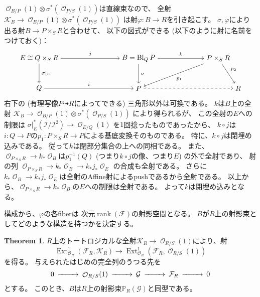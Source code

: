 \documentclass[uplatex]{jsarticle}
\theoremstyle{definition}
\newtheorem{thm}{Theorem}%
\DeclareMathOperator{\rank}{\mathrm{rank}}
\DeclareMathOperator{\Ext}{\mathrm{Ext}}
\DeclareMathOperator{\Bl}{\mathrm{Bl}}
\renewcommand{\P}{\mathbb{P}}
\newcommand{\mcF}{\mathcal{F}}
\newcommand{\mcG}{\mathcal{G}}
\newcommand{\mcI}{\mathcal{I}}
\newcommand{\mcK}{\mathcal{K}}
\newcommand{\mcO}{\mathcal{O}}
\DeclareMathOperator{\OOO}{\mcO}
\newcommand{\OB}{{\OOO_B}}
\renewcommand{\OE}{{\OOO_E}}
\newcommand{\OR}{{\OOO_R}}
\newcommand{\OO}[1]{\OOO_{#1}}
\newcommand{\dto}{\dashrightarrow}
\begin{document}
\(\OO{B/P}(1)\otimes \sigma^*(\OO{P/S}(1))\)は直線束なので、
全射\(\mcK_B\to \OO{B/P}(1)\otimes \sigma^*(\OO{P/S}(1))\)
は射\(\varphi:B\to R\)を引き起こす。
\(\sigma, \varphi\)により出る射\(B\to P\times_S R\)と合わせて、
以下の図式ができる (以下のように射に名前をつけておく)：
\[
\begin{tikzpicture}[auto]
  \node (B) at (0,1.5) {\(E \cong Q\times_SR\)};
  \node (A) at (0,0) {\(Q\)};
  \node (B') at (5,1.5) {\(B = \Bl_QP\)};
  \node (A') at (5,0) {\(P\)};
  \node (B'') at (9,1.5) {\(P\times_SR\)};
  \node (A'') at (10,0) {\(R\)};
  \draw[->] (B) to node{\scriptsize \(\sigma|_E\)} (A);
  \draw[->] (B) to node{\scriptsize \(j\)} (B');
  \draw[->] (B') to node{\scriptsize \(\sigma\)} (A');
  \draw[->] (A) to node{\scriptsize \(i\)} (A');
  \draw[->] (B') to node{\scriptsize \(k\)} (B'');
  \draw[->] (B'') to node{\scriptsize \(p_1\)} (A');
  \draw[->] (B'') to node{\scriptsize \(p_2\)} (A'');
  \draw[->,dashed] (A') to (A'');
\end{tikzpicture}
\]
右下の (有理写像\(P\dto R\)によってできる) 三角形以外は可換である。
\(k\)は\(B\)上の全射
\(\mcK_B\to \OO{B/P}(1)\otimes \sigma^*(\OO{P/S}(1))\)
により得られるが、
この全射の\(E\)への制限は
\(\sigma|_E^*(\mcI/\mcI^2)\to \OO{E/Q}(1)\)
を\(1\)回捻ったものであったから、
\(k\circ j\)は\(i:Q\to P\)の\(p_1:P\times_SR \to P\)による基底変換そのものである。
特に、\(k\circ j\)は閉埋め込みである。
従って\(k\)は閉部分集合の上への同相である。
また、\(\OO{P\times_SR}\to k_*\OB\)は\(p_1^{-1}(Q)\)
(つまり\(k\circ j\)の像、つまり\(E\)) の外で全射であり、
射の列
\(\OO{P\times_SR}\to k_*\OB \to k_*j_*\OE\)
の合成も全射である。
さらに\(k_*\OB \to k_*j_*\OE\)は全射のAffine射によるpushであるから全射である。
以上から、\(\OO{P\times_SR}\to k_*\OB\)の\(E\)への制限は全射である。
よって\(k\)は閉埋め込みとなる。

構成から、\(\varphi\)の各fiberは
次元\(\rank(\mcF)\)の射影空間となる。
\(B\)が\(R\)上の射影束としてどのような構造を持つかを決定する。


\begin{thm}\label{thm: main}
  \(R\)上のトートロジカルな全射\(\mcK_R\to \OO{R/S}(1)\)により、射
  \[
  \Ext^1_{\OR}(\mcF_R,\mcK_R) \to
  \Ext^1_{\OR}(\mcF_R,\OO{R/S}(1))
  \]
  を得る。
  与えられたはじめの完全列のうつる先を
  \[
  \begin{CD}
    0 @>>> \OO{R/S}(1) @>>> \mcG @>>> \mcF_R @>>> 0
  \end{CD}
  \]
  とする。
  このとき、\(B\)は\(R\)上の射影束\(\P_R(\mcG)\)と同型である。
\end{thm}
\end{document}
